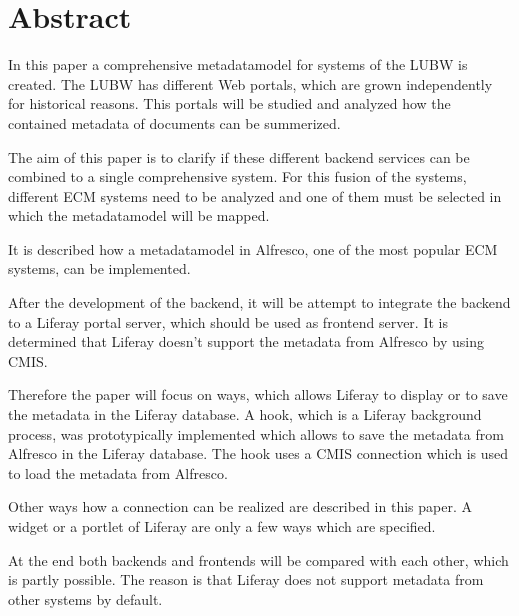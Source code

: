 \section{Abstract}
In this paper a comprehensive metadatamodel for systems of the \ac{LUBW} is created. The \ac{LUBW} has different Web portals, which are grown independently for historical reasons. This portals will be studied and analyzed how the contained metadata of documents can be summerized.

The aim of this paper is to clarify if these different backend services can be combined to a single comprehensive system. For this fusion of the systems, different \ac{ECM} systems need to be analyzed and one of them must be selected in which the metadatamodel will be mapped.

It is described how a metadatamodel in Alfresco, one of the most popular \ac{ECM} systems, can be implemented. 

After the development of the backend, it will be attempt to integrate the backend to a Liferay portal server, which should be used as frontend server. It is determined that Liferay doesn't support the metadata from Alfresco by using \ac{CMIS}.

Therefore the paper will focus on ways, which allows Liferay to display or to save the metadata in the Liferay database. A hook, which is a Liferay background process, was prototypically implemented which allows to save the metadata from Alfresco in the Liferay database. The hook uses a \ac{CMIS} connection which is used to load the metadata from Alfresco. 

Other ways how a connection can be realized are described in this paper. A widget or a portlet of Liferay are only a few ways which are specified.

At the end both backends and frontends will be compared with each other, which is partly possible. The reason is that Liferay does not support metadata from other systems by default.